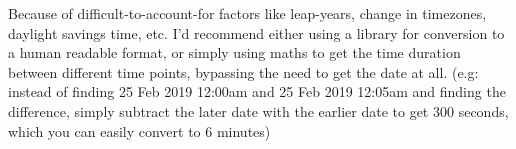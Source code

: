 \documentclass[a4paper,10pt, twocolumn]{article}
\begin{document}
Because of difficult-to-account-for factors like leap-years, change
in timezones, daylight savings time, etc. I'd recommend either using
a library for conversion to a human readable format, or simply using
maths to get the time duration between different time points, bypassing
the need to get the date at all. (e.g: instead of finding 25 Feb 2019 12:00am
and 25 Feb 2019 12:05am and finding the difference, simply subtract
the later date with the earlier date to get $300$ seconds, which
you can easily convert to $6$ minutes)

\nocite{*}


\end{document}
